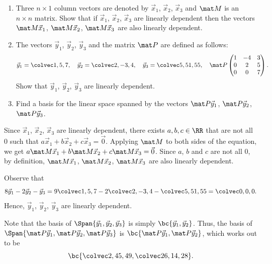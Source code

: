\begin{problem}
    \begin{enumerate}
        \item Three $n \times 1$ column vectors are denoted by $\vec x_1$, $\vec x_2$, $\vec x_3$ and $\mat M$ is an $n \times n$ matrix. Show that if $\vec x_1$, $\vec x_2$, $\vec x_3$ are linearly dependent then the vectors $\mat M \vec x_1$, $\mat M \vec x_2$, $\mat M \vec x_3$ are also linearly dependent.
        \item The vectors $\vec y_1$, $\vec y_2$, $\vec y_3$ and the matrix $\mat P$ are defined as follows: \[\vec y_1 = \cveciii157, \quad \vec y_2 = \cveciii2{-3}{4}, \quad \vec y_3 = \cveciii5{51}{55}, \quad \mat P \begin{pmatrix}1 & -4 & 3 \\ 0 & 2 & 5 \\ 0 & 0 & 7\end{pmatrix}.\] Show that $\vec y_1$, $\vec y_2$, $\vec y_3$ are linearly dependent.
        \item Find a basis for the linear space spanned by the vectors $\mat P \vec y_1$, $\mat P \vec y_2$, $\mat P \vec y_3$.
    \end{enumerate}
\end{problem}
\begin{solution}
    \begin{ppart}
        Since $\vec x_1$, $\vec x_2$, $\vec x_3$ are linearly dependent, there exists $a, b, c \in \RR$ that are not all 0 such that $a \vec x_1 + b \vec x_2 + c \vec x_3 = \vec 0$. Applying $\mat M$ to both sides of the equation, we get $a \mat M \vec x_1 + b \mat M \vec x_2 + c \mat M \vec x_3 = \vec 0$. Since $a$, $b$ and $c$ are not all 0, by definition, $\mat M \vec x_1$, $\mat M \vec x_2$, $\mat M \vec x_3$ are also linearly dependent.
    \end{ppart}
    \begin{ppart}
        Observe that \[8 \vec y_1 - 2 \vec y_2 - \vec y_3 = 9 \cveciii157 - 2 \cveciii2{-3}4 - \cveciii5{51}{55} = \cveciii000.\] Hence, $\vec y_1$, $\vec y_2$, $\vec y_3$ are linearly dependent.
    \end{ppart}
    \begin{ppart}
        Note that the basis of $\Span{\vec y_1, \vec y_2, \vec y_3}$ is simply $\bc{\vec y_1, \vec y_2}$. Thus, the basis of $\Span{\mat P \vec y_1, \mat P \vec y_2, \mat P \vec y_3}$ is $\bc{\mat P \vec y_1, \mat P \vec y_2}$, which works out to be \[\bc{\cveciii2{45}{49}, \cveciii{26}{14}{28}}.\]
    \end{ppart}
\end{solution}

